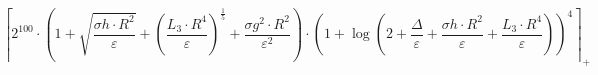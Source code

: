 \[\left\lceil 2^{100} \cdot \left(1 + \sqrt{\frac{\sigma h \cdot R^{2}}{\varepsilon}} + \left(\frac{L_3 \cdot R^{4}}{\varepsilon}\right)^{\frac{1}{5}} + \frac{\sigma g^{2} \cdot R^{2}}{\varepsilon^{2}}\right) \cdot \left(1 + \log\left(2 + \frac{\Delta}{\varepsilon} + \frac{\sigma h \cdot R^{2}}{\varepsilon} + \frac{L_3 \cdot R^{4}}{\varepsilon}\right)\right)^{4} \right\rceil_{+}\]
